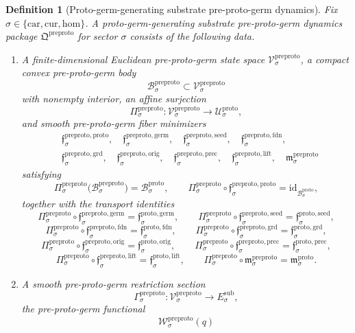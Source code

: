 \documentclass[11pt]{article}
\newcommand{\Car}{\mathrm{car}}
\newcommand{\Cur}{\mathrm{cur}}
\newcommand{\Hom}{\mathrm{hom}}
\newcommand{\SubTarget}[1]{E_{#1}^{\mathrm{sub}}}
\newcommand{\ProtoSpace}[1]{\mathcal U_{#1}^{\mathrm{proto}}}
\newcommand{\ProtoBody}[1]{\mathcal B_{#1}^{\mathrm{proto}}}
\newcommand{\ProtoGermMin}[1]{\mathfrak f_{#1}^{\mathrm{proto,germ}}}
\newcommand{\ProtoSeedMin}[1]{\mathfrak f_{#1}^{\mathrm{proto,seed}}}
\newcommand{\ProtoFoundMin}[1]{\mathfrak f_{#1}^{\mathrm{proto,fdn}}}
\newcommand{\ProtoGroundMin}[1]{\mathfrak f_{#1}^{\mathrm{proto,grd}}}
\newcommand{\ProtoOrigMin}[1]{\mathfrak f_{#1}^{\mathrm{proto,orig}}}
\newcommand{\ProtoPrecMin}[1]{\mathfrak f_{#1}^{\mathrm{proto,prec}}}
\newcommand{\ProtoLiftMin}[1]{\mathfrak f_{#1}^{\mathrm{proto,lift}}}
\newcommand{\ProtoSubMin}[1]{\mathfrak m_{#1}^{\mathrm{proto}}}
\newcommand{\PreProtoPackage}{\mathfrak Q^{\mathrm{preproto}}}
\newcommand{\PreProtoSpace}[1]{\mathcal V_{#1}^{\mathrm{preproto}}}
\newcommand{\PreProtoBody}[1]{\mathcal B_{#1}^{\mathrm{preproto}}}
\newcommand{\PreProtoProj}[1]{\Pi_{#1}^{\mathrm{preproto}}}
\newcommand{\PreProtoProtoMin}[1]{\mathfrak f_{#1}^{\mathrm{preproto,proto}}}
\newcommand{\PreProtoGermMin}[1]{\mathfrak f_{#1}^{\mathrm{preproto,germ}}}
\newcommand{\PreProtoSeedMin}[1]{\mathfrak f_{#1}^{\mathrm{preproto,seed}}}
\newcommand{\PreProtoFoundMin}[1]{\mathfrak f_{#1}^{\mathrm{preproto,fdn}}}
\newcommand{\PreProtoGroundMin}[1]{\mathfrak f_{#1}^{\mathrm{preproto,grd}}}
\newcommand{\PreProtoOrigMin}[1]{\mathfrak f_{#1}^{\mathrm{preproto,orig}}}
\newcommand{\PreProtoPrecMin}[1]{\mathfrak f_{#1}^{\mathrm{preproto,prec}}}
\newcommand{\PreProtoLiftMin}[1]{\mathfrak f_{#1}^{\mathrm{preproto,lift}}}
\newcommand{\PreProtoSubMin}[1]{\mathfrak m_{#1}^{\mathrm{preproto}}}
\newcommand{\PreProtoSection}[1]{\Gamma_{#1}^{\mathrm{preproto}}}
\newcommand{\PreProtoFunctional}[1]{\mathscr W_{#1}^{\mathrm{preproto}}}
\newtheorem{definition}{Definition}
\begin{document}
\begin{definition}[Proto-germ-generating substrate pre-proto-germ dynamics]
\label{def:preproto}
Fix \(\sigma\in\{\Car,\Cur,\Hom\}\). A proto-germ-generating substrate pre-proto-germ dynamics package \(\PreProtoPackage\) for sector \(\sigma\) consists of the following data.
\begin{enumerate}
    \item A finite-dimensional Euclidean pre-proto-germ state space \(\PreProtoSpace{\sigma}\), a compact convex pre-proto-germ body
    \[
    \PreProtoBody{\sigma}\subset\PreProtoSpace{\sigma}
    \]
    with nonempty interior, an affine surjection
    \[
    \PreProtoProj{\sigma}:\PreProtoSpace{\sigma}\to\ProtoSpace{\sigma},
    \]
    and smooth pre-proto-germ fiber minimizers
    \[
    \begin{aligned}
    &\PreProtoProtoMin{\sigma},\quad
    \PreProtoGermMin{\sigma},\quad
    \PreProtoSeedMin{\sigma},\quad
    \PreProtoFoundMin{\sigma},\\
    &\PreProtoGroundMin{\sigma},\quad
    \PreProtoOrigMin{\sigma},\quad
    \PreProtoPrecMin{\sigma},\quad
    \PreProtoLiftMin{\sigma},\quad
    \PreProtoSubMin{\sigma}
    \end{aligned}
    \]
    satisfying
    \[
    \PreProtoProj{\sigma}\bigl(\PreProtoBody{\sigma}\bigr)=\ProtoBody{\sigma},
    \qquad
    \PreProtoProj{\sigma}\circ\PreProtoProtoMin{\sigma}
    =
    \mathrm{id}_{\ProtoBody{\sigma}},
    \]
    together with the transport identities
    \[
    \PreProtoProj{\sigma}\circ\PreProtoGermMin{\sigma}
    =
    \ProtoGermMin{\sigma},
    \qquad
    \PreProtoProj{\sigma}\circ\PreProtoSeedMin{\sigma}
    =
    \ProtoSeedMin{\sigma},
    \]
    \[
    \PreProtoProj{\sigma}\circ\PreProtoFoundMin{\sigma}
    =
    \ProtoFoundMin{\sigma},
    \qquad
    \PreProtoProj{\sigma}\circ\PreProtoGroundMin{\sigma}
    =
    \ProtoGroundMin{\sigma},
    \]
    \[
    \PreProtoProj{\sigma}\circ\PreProtoOrigMin{\sigma}
    =
    \ProtoOrigMin{\sigma},
    \qquad
    \PreProtoProj{\sigma}\circ\PreProtoPrecMin{\sigma}
    =
    \ProtoPrecMin{\sigma},
    \]
    \[
    \PreProtoProj{\sigma}\circ\PreProtoLiftMin{\sigma}
    =
    \ProtoLiftMin{\sigma},
    \qquad
    \PreProtoProj{\sigma}\circ\PreProtoSubMin{\sigma}
    =
    \ProtoSubMin{\sigma}.
    \]
    \item A smooth pre-proto-germ restriction section
    \[
    \PreProtoSection{\sigma}:\PreProtoSpace{\sigma}\to\SubTarget{\sigma},
    \]
    the pre-proto-germ functional
    \[
    \PreProtoFunctional{\sigma}(q)
\]
\end{enumerate}
\end{definition}
\end{document}
